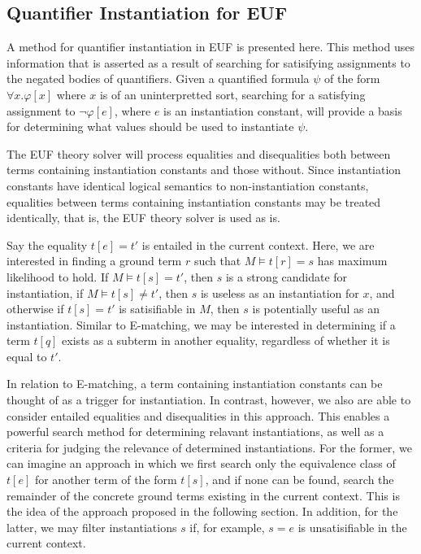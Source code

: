 \documentclass{llncs}
\begin{document}
\subsection{Quantifier Instantiation for EUF}

A method for quantifier instantiation in EUF is presented here.
This method uses information that is asserted as a result of searching for satisifying assignments to the negated bodies of quantifiers.
Given a quantified formula $\psi$ of the form $\forall x. \varphi[x]$ where $x$ is of an uninterpretted sort, searching for a satisfying assignment to $\neg \varphi[e]$, where $e$ is an instantiation constant, will provide a basis for determining what values should be used to instantiate $\psi$.

The EUF theory solver will process equalities and disequalities both between terms containing instantiation constants and those without.
Since instantiation constants have identical logical semantics to non-instantiation constants, equalities between terms containing instantiation constants may be treated identically, that is, the EUF theory solver is used as is.

Say the equality $t[e] = t'$ is entailed in the current context.
Here, we are interested in finding a ground term $r$ such that $M \models t[r] = s$ has maximum likelihood to hold.
If $M \models t[s] = t'$, then $s$ is a strong candidate for instantiation, if $M \models t[s] \neq t'$, then $s$ is useless as an instantiation for $x$, and otherwise if $t[s] = t'$ is satisifiable in $M$, then $s$ is potentially useful as an instantiation.
Similar to E-matching, we may be interested in determining if a term $t[q]$ exists as a subterm in another equality, regardless of whether it is equal to $t'$.

In relation to E-matching, a term containing instantiation constants can be thought of as a trigger for instantiation.
In contrast, however, we also are able to consider entailed equalities and disequalities in this approach.
This enables a powerful search method for determining relavant instantiations, as well as a criteria for judging the relevance of determined instantiations.
For the former, we can imagine an approach in which we first search only the equivalence class of $t[e]$ for another term of the form $t[s]$, and if none can be found, search the remainder of the concrete ground terms existing in the current context.
This is the idea of the approach proposed in the following section.
In addition, for the latter, we may filter instantiations $s$ if, for example, $s = e$ is unsatisifiable in the current context.
\end{document}
